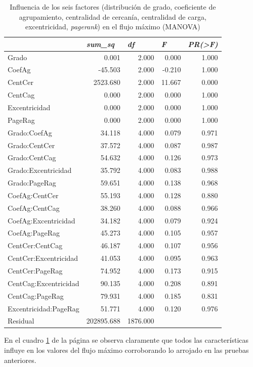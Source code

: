 \documentclass{article}
\begin{document}
\begin{table}[htbp]
  \centering
  \caption{Influencia de los seis factores (distribución de grado, coeficiente de agrupamiento, centralidad de cercanía, centralidad de carga, excentricidad, \textit{pagerank}) en el flujo máximo (MANOVA)}
    \begin{tabular}{lrrrr}
    \toprule
          & \multicolumn{1}{l}{\textit{\textbf{sum\_sq}}} & \multicolumn{1}{l}{\textit{\textbf{df}}} & \multicolumn{1}{l}{\textit{\textbf{F}}} & \multicolumn{1}{l}{\textit{\textbf{PR(>F)}}} \\
    \midrule
    Grado & 0.001 & 2.000 & 0.000 & 1.000 \\
    CoefAg & -45.503 & 2.000 & -0.210 & 1.000 \\
    CentCer & 2523.680 & 2.000 & 11.667 & 0.000 \\
    CentCag & 0.000 & 2.000 & 0.000 & 1.000 \\
    Excentricidad & 0.000 & 2.000 & 0.000 & 1.000 \\
    PageRag & 0.000 & 2.000 & 0.000 & 1.000 \\
    Grado:CoefAg & 34.118 & 4.000 & 0.079 & 0.971 \\
    Grado:CentCer & 37.572 & 4.000 & 0.087 & 0.987 \\
    Grado:CentCag & 54.632 & 4.000 & 0.126 & 0.973 \\
    Grado:Excentricidad & 35.792 & 4.000 & 0.083 & 0.988 \\
    Grado:PageRag & 59.651 & 4.000 & 0.138 & 0.968 \\
    CoefAg:CentCer & 55.193 & 4.000 & 0.128 & 0.880 \\
    CoefAg:CentCag & 38.260 & 4.000 & 0.088 & 0.966 \\
    CoefAg:Excentricidad & 34.182 & 4.000 & 0.079 & 0.924 \\
    CoefAg:PageRag & 45.273 & 4.000 & 0.105 & 0.957 \\
    CentCer:CentCag & 46.187 & 4.000 & 0.107 & 0.956 \\
    CentCer:Excentricidad & 41.053 & 4.000 & 0.095 & 0.963 \\
    CentCer:PageRag & 74.952 & 4.000 & 0.173 & 0.915 \\
    CentCag:Excentricidad & 90.135 & 4.000 & 0.208 & 0.891 \\
    CentCag:PageRag & 79.931 & 4.000 & 0.185 & 0.831 \\
    Excentricidad:PageRag & 51.771 & 4.000 & 0.120 & 0.976 \\
    Residual & 202895.688 & 1876.000 &       &  \\
    \bottomrule
    \end{tabular}%
  \label{tab:t33}%
\end{table}%
 
En el cuadro \ref{tab:t33} de la página \pageref{tab:t33} se observa claramente que todos las características influye en los valores del flujo máximo corroborando lo arrojado en las pruebas anteriores.


\newpage


\end{document}
